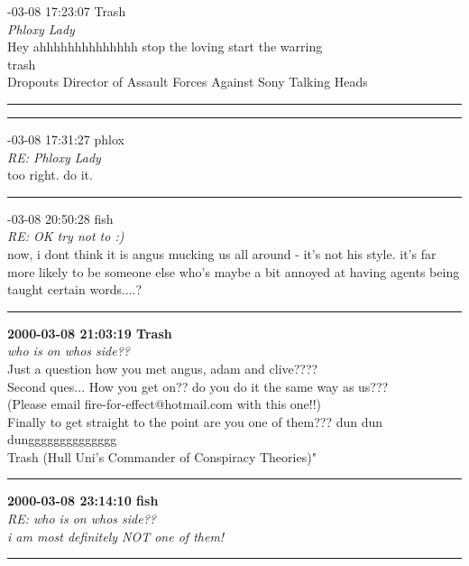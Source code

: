 \begin{mail}

{-03-08 17:23:07 Trash}\\
{\itshape Phloxy Lady}\\
Hey ahhhhhhhhhhhhhh stop the loving start the warring\\
trash\\
Dropouts Director of Assault Forces Against Sony Talking Heads\\

\rule{0.8\textwidth}{.4pt}
\clearpage

\rule{0.8\textwidth}{.4pt}

{-03-08 17:31:27 phlox}\\
{\itshape RE: Phloxy Lady}\\
too right. do it.\\


\rule{0.8\textwidth}{.4pt}


{-03-08 20:50:28 fish}\\
{\itshape RE: OK try not to :)}\\
now, i dont think it is angus mucking us all around - it's not his style. it's far more likely to be someone 
else who's maybe a bit annoyed at having agents being taught certain words....?	\\

\rule{0.8\textwidth}{.4pt}

{\bfseries 2000-03-08 21:03:19	Trash}	\\
{\itshape who is on whos side??}\\
Just a question how you met angus, adam and clive????\\
Second ques... How you get on?? do you do it the same way as us??? \\
(Please email fire-for-effect@hotmail.com with this one!!)\\
Finally to get straight to the point are you one of them??? dun dun dungggggggggggggg \\
Trash (Hull Uni's Commander of Conspiracy Theories)"	\\

\rule{0.8\textwidth}{.4pt}

{\bfseries 2000-03-08 23:14:10 fish}\\
{\itshape RE: who is on whos side??}\\
{\itshape i am most definitely NOT one of them!}\\

\rule{0.8\textwidth}{.4pt}


\end{mail}
